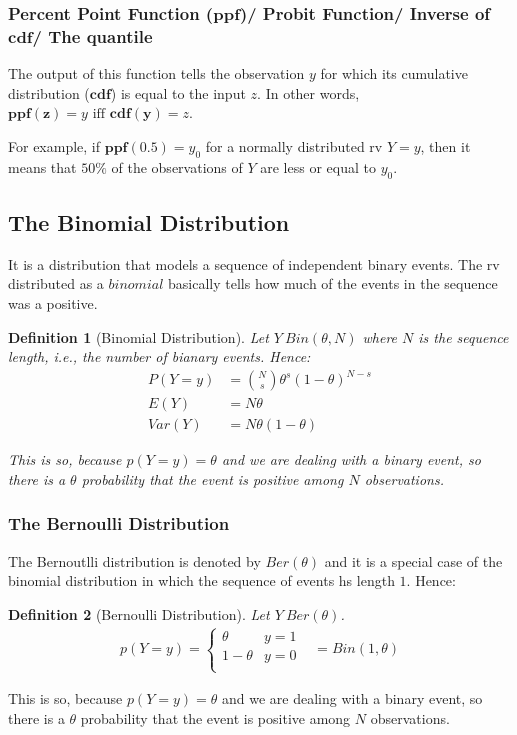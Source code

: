 \documentclass{article}
\newtheorem{definition}{Definition}[section]
\begin{document}
\subsubsection{Percent Point Function ($\mathbf{ppf}$)/ Probit  Function/ Inverse of $\mathbf{cdf}$/ The quantile }

The output of this function tells the observation  $y$ for which its cumulative distribution ($\mathbf{cdf}$) is equal to the input $z$. In other words, $\mathbf{ppf(z)} = y \text{  iff  }  \mathbf{cdf(y)} = z$.

For example, if $\mathbf{ppf(0.5)} = y_0$ for a normally distributed rv $Y = y$, then it means that $50\%$ of the observations of $Y$ are less or equal to $y_0$.


\subsection{The Binomial Distribution}

It is a distribution that models a sequence of independent binary events. The rv distributed as a $binomial$ basically tells how much of the events in the sequence was a positive.

\begin{definition}[Binomial Distribution]
	
	Let $Y  ~ Bin(\theta, N)$ where $N$ is the sequence length, i.e., the number of bianary events. Hence:
	\begin{align}
		P(Y = y) &= \binom{N}{s}\theta^s(1 - \theta)^{N-s}\\
		E(Y) &= N\theta \\
		Var(Y) &= N\theta(1 - \theta) 
	\end{align}
	
	This is so, because $p(Y = y) = \theta$ and we are dealing with a binary event, so there is a $\theta$ probability that the event is positive among $N$ observations.
\end{definition}

\subsubsection{The Bernoulli Distribution}
The Bernoutlli distribution is denoted by $Ber(\theta)$ and it is a special case of the binomial distribution in which the sequence of events hs length $1$. Hence:

\begin{definition}[Bernoulli Distribution]
	
	Let $Y  ~ Ber(\theta)$.
	\begin{align}
		p(Y = y) = 
		\begin{cases} 
			\theta & y =  1 \\
			1 -  \theta & y = 0 \\
		\end{cases}
		&= Bin(1, \theta)
	\end{align}
\end{definition}
This is so, because $p(Y = y) = \theta$ and we are dealing with a binary event, so there is a $\theta$ probability that the event is positive among $N$ observations.
\end{document}
